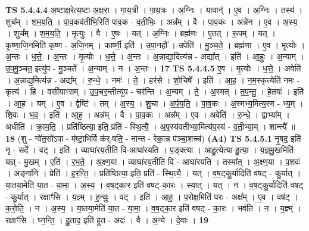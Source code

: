 \documentclass[17pt]{extarticle}
\begin{document}
                  \newline
                                \textbf{ TS 5.4.4.4} \newline
                  अ॒ष्टाक्ष॒रेत्य॒ष्टा-अ॒क्ष॒रा॒ । गा॒य॒त्री । गा॒य॒त्रः । अ॒ग्निः । यावान्॑ । ए॒व । अ॒ग्निः । तस्य॑ । शुच᳚म् । श॒म॒य॒ति॒ । पा॒व॒कव॑तीभि॒रिति॑ पाव॒क - व॒ती॒भिः॒ । अन्न᳚म् । वै । पा॒व॒कः । अन्ने॑न । ए॒व । अ॒स्य॒ । शुच᳚म् । श॒म॒य॒ति॒ । मृ॒त्युः । वै ।   ए॒षः । यत् । अ॒ग्निः । ब्रह्म॑णः । ए॒तत् । रू॒पम् । यत् । कृ॒ष्णा॒जि॒नमिति॑ कृष्ण - अ॒जि॒नम् । कार्ष्णी॒ इति॑ । उ॒पा॒नहौ᳚ । उपेति॑ । मु॒ञ्च॒ते॒ । ब्रह्म॑णा । ए॒व । मृ॒त्योः । अ॒न्तः । ध॒त्ते॒ । अ॒न्तः । मृ॒त्योः । ध॒त्ते॒ । अ॒न्तः । अ॒न्नाद्या॒दित्य॑न्न - अद्या᳚त् । इति॑ । आ॒हुः॒ । अ॒न्याम् । उ॒प॒मु॒ञ्चत॒ इत्यु॑प - मु॒ञ्चते᳚ । अ॒न्याम् । न । अ॒न्तः । \textbf{  17} \newline
                  \newline
                                \textbf{ TS 5.4.4.5} \newline
                  ए॒व । मृ॒त्योः । ध॒त्ते॒ । अवेति॑ । अ॒न्नाद्य॒मित्य॑न्न - अद्य᳚म् । रु॒न्धे॒ । नमः॑ । ते॒ । हर॑से । शो॒चिषे᳚ । इति॑ । आ॒ह॒ । न॒म॒स्कृत्येति॑ नमः - कृत्य॑ । हि । वसी॑याꣳसम् । उ॒प॒चर॒न्तीत्यु॑प - चर॑न्ति । अ॒न्यम् । ते॒ । अ॒स्मत् । त॒प॒न्तु॒ । हे॒तयः॑ । इति॑ । आ॒ह॒ । यम् । ए॒व । द्वेष्टि॑ । तम् । अ॒स्य॒ । शु॒चा । अ॒र्प॒य॒ति॒ । पा॒व॒कः । अ॒स्मभ्य॒मित्य॒स्म - भ्य॒म् । शि॒वः । भ॒व॒ । इति॑ । आ॒ह॒ । अन्न᳚म् । वै । पा॒व॒कः । अन्न᳚म् । ए॒व । अवेति॑ । रु॒न्धे॒ । द्वाभ्या᳚म् । अधीति॑ । क्रा॒म॒ति॒ । प्रति॑ष्ठित्या॒ इति॒ प्रति॑ - स्थि॒त्यै॒ । अ॒प॒स्य॑वतीभ्या॒मित्य॑प॒स्य॑ - व॒ती॒भ्या॒म् । शान्त्यै᳚ ॥ \textbf{  18 } \newline
                  \newline
                      (शु - ग्वे॑त॒सो॑ऽपा - म॑ष्टा॒भिर्वि क॑र्.षति॒ - नान्त - रेका॒न्न प॑ञ्चा॒शच्च॑)  \textbf{(A4)} \newline \newline
                                \textbf{ TS 5.4.5.1} \newline
                  नृ॒षद॒ इति॑ नृ - सदे᳚ । वट् । इति॑ । व्याघा॑रय॒तीति॑ वि-आघा॑रयति । प॒ङ्क्त्या । आहु॒त्येत्या-हु॒त्या॒ । य॒ज्ञ्॒मु॒खमिति॑ यज्ञ् - मु॒खम् । एति॑ । र॒भ॒ते॒ । अ॒क्ष्ण॒या । व्याघा॑रय॒तीति॑ वि - आघा॑रयति । तस्मा᳚त् । अ॒क्ष्ण॒या । प॒शवः॑ । अङ्गा॑नि । प्रेति॑ । ह॒र॒न्ति॒ । प्रति॑ष्ठित्या॒ इति॒ प्रति॑ - स्थि॒त्यै॒ । यत् । व॒ष॒ट्कु॒र्यादिति॑ वषट् - कु॒र्यात् । या॒तया॒मेति॑ या॒त - या॒मा॒ । अ॒स्य॒ । व॒ष॒ट्का॒र इति॑ वषट्-का॒रः । स्या॒त् । यत् । न । व॒ष॒ट्कु॒र्यादिति॑ वषट् - कु॒र्यात् । रक्षाꣳ॑सि । य॒ज्ञ्म् । ह॒न्युः॒ । वट् । इति॑ । आ॒ह॒ । प॒रोक्ष॒मिति॑ परः - अक्ष᳚म् । ए॒व । वष॑ट् । क॒रो॒ति॒ । न । अ॒स्य॒ । या॒तया॒मेति॑ या॒त - या॒मा॒ । व॒ष॒ट्का॒र इति॑ वषट् - का॒रः । भव॑ति । न । य॒ज्ञ्म् । रक्षाꣳ॑सि । घ्न॒न्ति॒ । हु॒ताद॒ इति॑ हुत - अदः॑ । वै । अ॒न्ये । दे॒वाः । \textbf{  19} \newline
\end{document}
